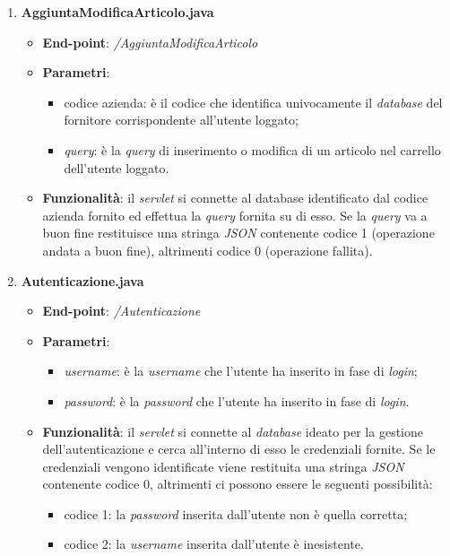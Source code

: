 \documentclass[12pt, a4paper, titlepage]{report}
\begin{document}
	\begin{enumerate}
		\item \textbf{AggiuntaModificaArticolo.java}
		\begin{itemize}
			\item \textbf{End-point}: \textit{/AggiuntaModificaArticolo}
			\item \textbf{Parametri}:
			\begin{itemize}
				\item codice azienda: è il codice che identifica univocamente il \textit{database} del fornitore corrispondente all'utente loggato;
				\item \textit{query}: è la \textit{query} di inserimento o modifica di un articolo nel carrello dell'utente loggato.
			\end{itemize}
			\item \textbf{Funzionalità}: il \textit{servlet} si connette al database identificato dal codice azienda fornito ed effettua la \textit{query} fornita su di esso. Se la \textit{query} va a buon fine restituisce una stringa \textit{JSON} contenente codice 1 (operazione andata a buon fine), altrimenti codice 0 (operazione fallita).
		\end{itemize}
	
		\item \textbf{Autenticazione.java}
		\begin{itemize}
			\item \textbf{End-point}: \textit{/Autenticazione}
			\item \textbf{Parametri}:
			\begin{itemize}
				\item \textit{username}: è la \textit{username} che l'utente ha inserito in fase di \textit{login};
				\item \textit{password}: è la \textit{password} che l'utente ha inserito in fase di \textit{login}.
			\end{itemize}
			\item \textbf{Funzionalità}: il \textit{servlet} si connette al \textit{database} ideato per la gestione dell'autenticazione e cerca all'interno di esso le credenziali fornite. Se le credenziali vengono identificate viene restituita una stringa \textit{JSON} contenente codice 0, altrimenti ci possono essere le seguenti possibilità:
			\begin{itemize}
				\item codice 1: la \textit{password} inserita dall'utente non è quella corretta;
				\item codice 2: la \textit{username} inserita dall'utente è inesistente.
			\end{itemize}
		\end{itemize}
	

\end{enumerate}
\end{document}
